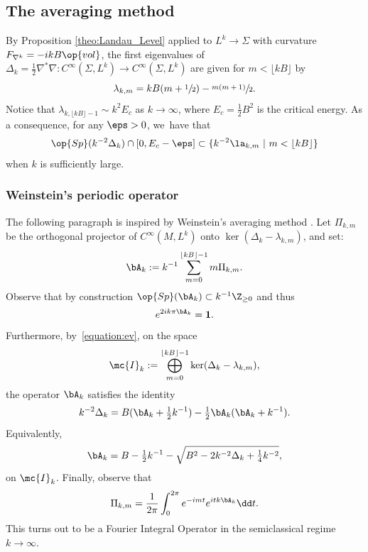 \subsection{The averaging method} \label{ssection:averaging} By Proposition \ref{theo:Landau_Level}
applied to $L^k \to \Sigma$ with curvature $F_{\nabla^k}=-ikB
\op{vol}$, the first eigenvalues of $\Delta_k = \tfrac{1}{2}\nabla^*\nabla : C^\infty(\Sigma,L^k) \to C^\infty(\Sigma,L^k)$ are given for $m < \lfloor kB\rfloor $ by
\begin{equation}
\label{equation:ev}
\lambda_{k,m} = kB (m+\sfrac{1}{2})-\sfrac{m(m+1)}{2}.
\end{equation}
Notice that $\lambda_{k, \lfloor kB \rfloor - 1 } \sim k^2 E_c$ as $k
\rightarrow \infty$, where $E_c
= \tfrac{1}{2} B^2$ is the critical energy. As a consequence, for any $\eps >0$, we~have that
\[
\op{Sp}
(k^{-2} \Delta_k) \cap [0, E_c -\eps ] \subset \{k^{-2} \la_{k,m} ~|~ m < \lfloor
kB\rfloor \}\]
when $k$ is sufficiently large.

\subsubsection{Weinstein's periodic operator} The following paragraph is
inspired by Weinstein's averaging method \cite{Weinstein-77}. Let $\Pi_{k,m}$ be the orthogonal projector of $C^\infty(M, L^k)$ onto
$\ker(\Delta _k -\lambda_{k,m})$, and set:
\begin{equation}
\label{equation:a}
\bA_k := k^{-1} \sum_{m =0 }^{ \lfloor kB \rfloor -1} m \Pi_{k,m}.
\end{equation}
Observe that by construction $\op{Sp}(\bA_k) \subset k^{-1} \Z_{\geq 0}$ and thus
\begin{equation}
\label{equation:cool}
e^{2i k \pi \bA_k } = \mathbf{1}.
\end{equation}
Furthermore, by~\eqref{equation:ev}, on the space
\[
\mc{I}_k := \bigoplus_{m=0}^{ \lfloor kB \rfloor -1}
\ker(\Delta_k-\lambda_{k,m}),
\]
the operator $\bA_k$ satisfies the identity
\begin{equation}
\label{equation:relation}
k^{-2} \Delta_k = B(\bA_k+ \tfrac{1}{2} k^{-1})- \tfrac{1}{2}
\bA_k(\bA_k+ k^{-1}).
\end{equation}
Equivalently,
\begin{equation}
\label{equation:relation2}
\bA_k= B-\tfrac{1}{2} k^{-1} - \sqrt{ B^2 - 2 k^{-2}
\Delta_k + \tfrac{1}{4} k^{-2}},
\end{equation}
on $\mc{I}_k$. Finally, observe that
\begin{equation}
\label{eq:integrale_projecteur}
\Pi_{k,m} = \dfrac{1}{2\pi} \int_0^{2\pi} e^{-imt} e^{itk\bA_k} \dd t.
\end{equation}
This turns out to be a Fourier Integral Operator in the semiclassical regime $k \to \infty$.

